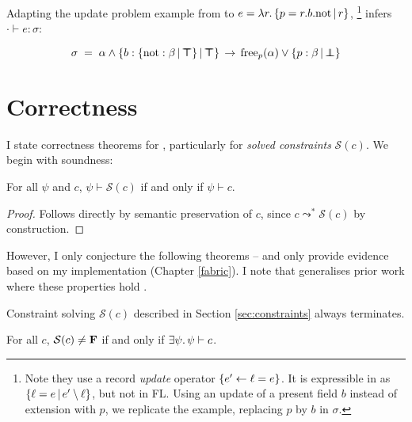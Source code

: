 \begin{example}
    Adapting the update problem example from \textcite{operations-on-records} to $e = \fllam r \flext{p = \flproj{\flproj{r}{b}}{\mathrm{not}}}{r}$,%
    \footnote{Note they use a record \emph{update} operator $\flrec{ e' \leftarrow \ell = e}$. It is expressible in \fabric{} as $\flext{\ell = e}{e' \fbrestricted \ell}$, but not in FL. Using an update of a present field $b$ instead of extension with $p$, we replicate the example, replacing $p$ by $b$ in $\sigma$.}
    \inference{} infers $\cdot \vdash e : \sigma$:

    \vspace{-0.7em}
    $$ \sigma \;=\; \alpha \meet \flext{b: \flext{\mathrm{not}: \beta}{\flftop}}{\flftop} \,\to\, \mathrm{free}_p(\alpha) \join \flext{p: \beta}{\flfbot} $$
\end{example}

\needspace{6em}
\section{Correctness}
\label{sec:correctness}

I state correctness theorems for \inference{}, particularly for \emph{solved constraints} $\mathcal S(c)$. We begin with soundness:
\begin{theorem}[Soundness]
    For all $\psi$ and $c$, $\psi \vdash \mathcal S(c)$ if and only if $\psi \vdash c$.
\end{theorem}
\begin{proof}
    Follows directly by semantic preservation of $c$, since $c \leadsto^* \mathcal S(c)$ by construction.
\end{proof}

However, I only conjecture the following theorems -- and only provide evidence based on my implementation (Chapter \ref{fabric}). I note that \inference{} generalises prior work where these properties hold \cite{simple-sub, mlstruct}. 

\begin{conjecture}[Termination]
    Constraint solving $\mathcal S(c)$ described in Section \ref{sec:constraints} always terminates.
\end{conjecture}

\begin{conjecture}[Completeness]    
    For all $c$, $\mathcal S(c) \ne \mathbf F$ if and only if $\exists \psi \ldotp \psi \vdash c$.
\end{conjecture}

